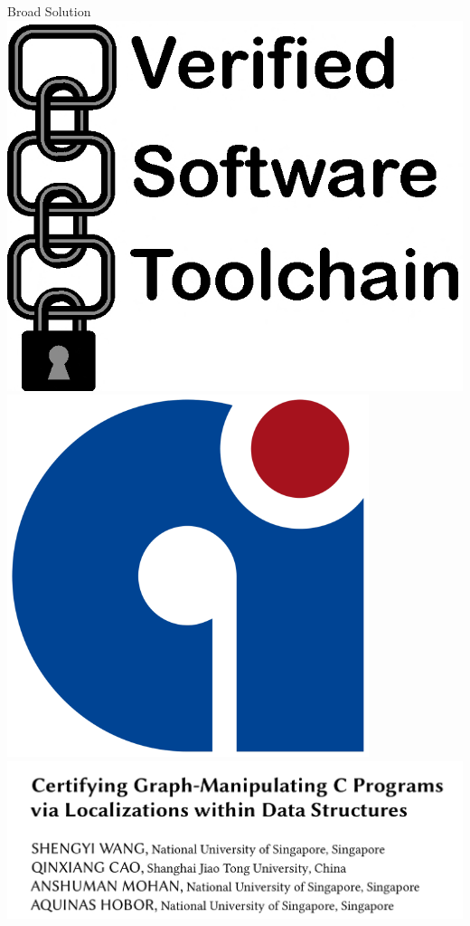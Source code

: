 \documentclass[usenames, xcolor=dvipsnames]{beamer}
\begin{document}
\begin{frame}{Broad Solution}
\includegraphics[scale=0.09]{vst_logo}
\hspace{2em} \includegraphics[scale=0.12]{compcert_logo}
\hspace{2em} \includegraphics[scale=0.2]{paper_screen}


\end{frame}
\end{document}
